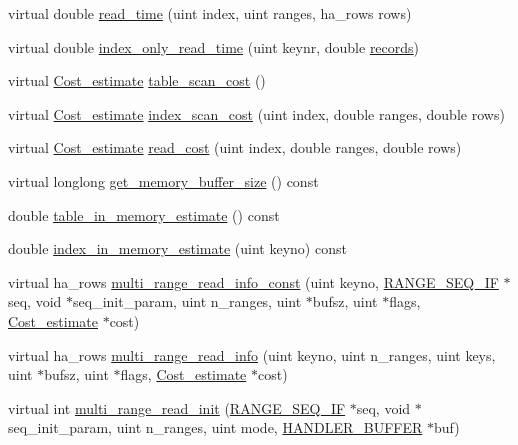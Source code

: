 \begin{DoxyCompactItemize}
\item 
virtual double \mbox{\hyperlink{classhandler_a061b519fb16fbff126b0e21530973c2e}{read\+\_\+time}} (uint index, uint ranges, ha\+\_\+rows rows)
\item 
virtual double \mbox{\hyperlink{classhandler_a4a2ac6b2908a899c0ce230818bb7a993}{index\+\_\+only\+\_\+read\+\_\+time}} (uint keynr, double \mbox{\hyperlink{classhandler_ae5b7b96354fd25da35a940e656d91940}{records}})
\item 
virtual \mbox{\hyperlink{classCost__estimate}{Cost\+\_\+estimate}} \mbox{\hyperlink{classhandler_a5e9380355a7eea5386ef061f36479258}{table\+\_\+scan\+\_\+cost}} ()
\item 
virtual \mbox{\hyperlink{classCost__estimate}{Cost\+\_\+estimate}} \mbox{\hyperlink{classhandler_a5575d58c0acbb1924f7f3d3eb756612a}{index\+\_\+scan\+\_\+cost}} (uint index, double ranges, double rows)
\item 
virtual \mbox{\hyperlink{classCost__estimate}{Cost\+\_\+estimate}} \mbox{\hyperlink{classhandler_a196d85fe55a71cc09c642592e771b662}{read\+\_\+cost}} (uint index, double ranges, double rows)
\item 
virtual longlong \mbox{\hyperlink{classhandler_a475f7fbe39f6ff0e9da2ac6c3d6c629e}{get\+\_\+memory\+\_\+buffer\+\_\+size}} () const
\item 
double \mbox{\hyperlink{classhandler_a171927b3afde9e800755b834bd8d31bd}{table\+\_\+in\+\_\+memory\+\_\+estimate}} () const
\item 
double \mbox{\hyperlink{classhandler_a375fdfc86f021f336777324dd5a98a02}{index\+\_\+in\+\_\+memory\+\_\+estimate}} (uint keyno) const
\item 
virtual ha\+\_\+rows \mbox{\hyperlink{classhandler_a5ee356d2340552eb121d423fc01597f8}{multi\+\_\+range\+\_\+read\+\_\+info\+\_\+const}} (uint keyno, \mbox{\hyperlink{structst__range__seq__if}{R\+A\+N\+G\+E\+\_\+\+S\+E\+Q\+\_\+\+IF}} $\ast$seq, void $\ast$seq\+\_\+init\+\_\+param, uint n\+\_\+ranges, uint $\ast$bufsz, uint $\ast$flags, \mbox{\hyperlink{classCost__estimate}{Cost\+\_\+estimate}} $\ast$cost)
\item 
virtual ha\+\_\+rows \mbox{\hyperlink{classhandler_a5add40a6cd7088ffef25a3816294b624}{multi\+\_\+range\+\_\+read\+\_\+info}} (uint keyno, uint n\+\_\+ranges, uint keys, uint $\ast$bufsz, uint $\ast$flags, \mbox{\hyperlink{classCost__estimate}{Cost\+\_\+estimate}} $\ast$cost)
\item 
virtual int \mbox{\hyperlink{classhandler_a33e8899f4bae262b6b91c7284f1d946e}{multi\+\_\+range\+\_\+read\+\_\+init}} (\mbox{\hyperlink{structst__range__seq__if}{R\+A\+N\+G\+E\+\_\+\+S\+E\+Q\+\_\+\+IF}} $\ast$seq, void $\ast$seq\+\_\+init\+\_\+param, uint n\+\_\+ranges, uint mode, \mbox{\hyperlink{structst__handler__buffer}{H\+A\+N\+D\+L\+E\+R\+\_\+\+B\+U\+F\+F\+ER}} $\ast$buf)

\end{DoxyCompactItemize}
